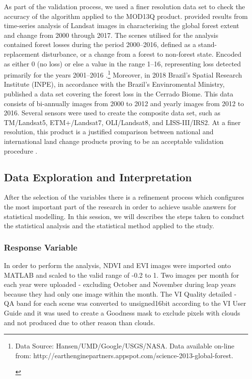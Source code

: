 As part of the validation process, we used a finer resolution data set to check the accuracy of the algorithm applied to the MOD13Q product. \citet{Hansen_2013} provided results from time-series analysis of Landsat images in characterising the global forest extent and change from 2000 through 2017. The scenes utilised for the analysis contained forest losses during the period 2000–2016, defined as a stand-replacement disturbance, or a change from a forest to non-forest state. Encoded as either 0 (no loss) or else a value in the range 1–16, representing loss detected primarily for the years 2001–2016 \citep{gfc_2017}.\footnote{\begin{flushleft}Data Source: Hansen/UMD/Google/USGS/NASA. Data available on-line from: http://earthenginepartners.appspot.com/science-2013-global-forest. \end{flushleft}} Moreover, in 2018 Brazil's Spatial Research Institute (INPE), in accordance with the Brazil's Envinromental Ministry, published a data set covering the forest loss in the Cerrado Biome. This data consists of bi-annually images from 2000 to 2012 and yearly images from 2012 to 2016. Several sensors were used to create the composite data set, such as TM/Landsat5, ETM+/Landsat7, OLI/Landsat8, and LISS-III/IRS2. At a finer resolution, this product is a justified comparison between national and international land change products proving to be an acceptable validation procedure \citep{brito_2018}.


\subsection{Data Exploration and Interpretation}

After the selection of the variables there is a refinement process which configures the most important part of the research in order to achieve usable answers for statistical modelling. In this session, we will describes the steps taken to conduct the statistical analysis and the statistical method applied to the study.

\subsubsection{Response Variable}  %


In order to perform the analysis, NDVI and EVI images were imported onto MATLAB and scaled to the valid range of -0.2 to 1. Two images per month for each year were uploaded - excluding October and November during leap years because they had only one image within the month. The VI Quality detailed - QA band for each scene was converted to unsigned16bit according to the VI User Guide \citep{didan_munoz_2015} and it was used to create a Goodness mask to exclude pixels with clouds and not produced due to other reason than clouds. 

